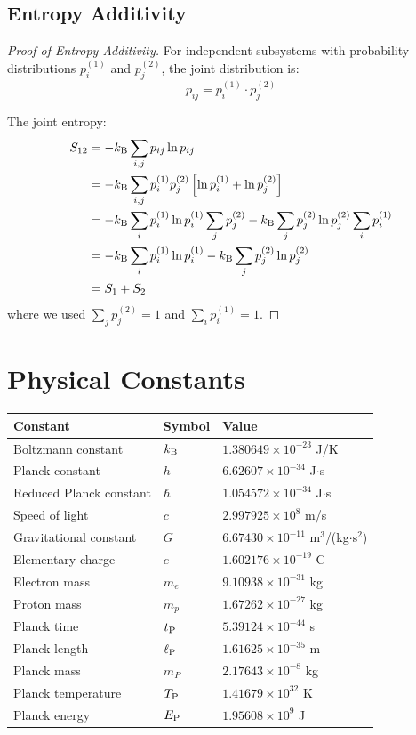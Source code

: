 \subsection{Entropy Additivity}

\begin{proof}[Proof of Entropy Additivity]
For independent subsystems with probability distributions $p_i^{(1)}$ and $p_j^{(2)}$, the joint distribution is:
\begin{equation}
p_{ij} = p_i^{(1)} \cdot p_j^{(2)}
\end{equation}

The joint entropy:
\begin{align}
S_{12} &= -k_{\mathrm{B}} \sum_{i,j} p_{ij} \ln p_{ij} \\
&= -k_{\mathrm{B}} \sum_{i,j} p_i^{(1)} p_j^{(2)} \left[\ln p_i^{(1)} + \ln p_j^{(2)}\right] \\
&= -k_{\mathrm{B}} \sum_i p_i^{(1)} \ln p_i^{(1)} \sum_j p_j^{(2)} - k_{\mathrm{B}} \sum_j p_j^{(2)} \ln p_j^{(2)} \sum_i p_i^{(1)} \\
&= -k_{\mathrm{B}} \sum_i p_i^{(1)} \ln p_i^{(1)} - k_{\mathrm{B}} \sum_j p_j^{(2)} \ln p_j^{(2)} \\
&= S_1 + S_2
\end{align}
where we used $\sum_j p_j^{(2)} = 1$ and $\sum_i p_i^{(1)} = 1$.
\end{proof}

\section{Physical Constants}

\begin{center}
\begin{tabular}{lll}
\toprule
\textbf{Constant} & \textbf{Symbol} & \textbf{Value} \\
\midrule
Boltzmann constant & $k_{\mathrm{B}}$ & $1.380649 \times 10^{-23}$ J/K \\
Planck constant & $h$ & $6.62607 \times 10^{-34}$ J$\cdot$s \\
Reduced Planck constant & $\hbar$ & $1.054572 \times 10^{-34}$ J$\cdot$s \\
Speed of light & $c$ & $2.997925 \times 10^{8}$ m/s \\
Gravitational constant & $G$ & $6.67430 \times 10^{-11}$ m$^3$/(kg$\cdot$s$^2$) \\
Elementary charge & $e$ & $1.602176 \times 10^{-19}$ C \\
Electron mass & $m_e$ & $9.10938 \times 10^{-31}$ kg \\
Proton mass & $m_p$ & $1.67262 \times 10^{-27}$ kg \\
\midrule
Planck time & $t_{\mathrm{P}}$ & $5.39124 \times 10^{-44}$ s \\
Planck length & $\ell_{\mathrm{P}}$ & $1.61625 \times 10^{-35}$ m \\
Planck mass & $m_P$ & $2.17643 \times 10^{-8}$ kg \\
Planck temperature & $T_{\mathrm{P}}$ & $1.41679 \times 10^{32}$ K \\
Planck energy & $E_{\mathrm{P}}$ & $1.95608 \times 10^{9}$ J \\
\bottomrule
\end{tabular}
\end{center}

